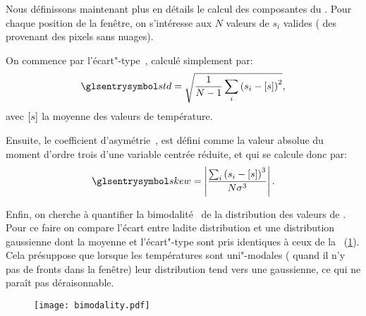 Nous définissons maintenant plus en détails le calcul des composantes du .
Pour chaque position de la fenêtre, on s'intéresse aux \(N\) valeurs de  \(s_{i}\) valides ( des provenant des pixels sans nuages).

On commence par l'écart"-type~, calculé simplement par:
\begin{equation}
  \am{std} = \sqrt{\frac{1}{N-1} \sum_i \paren{s_i - \moy{s}}^2},
\end{equation}
avec \(\left[s\right]\) la moyenne des valeurs de température.

Ensuite, le coefficient d'asymétrie~, est défini comme la valeur absolue du moment d'ordre trois d'une variable centrée réduite, et qui se calcule donc par:
\begin{equation}
  \am{skew} = \abs{\frac{\sum_i \paren{s_i - \moy{s}}^3} {N \sigma^3}}.
\end{equation}

Enfin, on cherche à quantifier la bimodalité~ de la distribution des valeurs de .
Pour ce faire on compare l'écart entre ladite distribution et une distribution gaussienne dont la moyenne et l'écart"-type sont pris identiques à ceux de la ~(\cref{fig:bimodality}).
Cela présuppose que lorsque les températures sont uni"-modales ( quand il n'y pas de fronts dans la fenêtre) leur distribution tend vers une gaussienne, ce qui ne paraît pas déraisonnable.

\begin{figure}
  \centering
  \texttt{[image: bimodality.pdf]}
  \label{fig:bimodality}
\end{figure}

